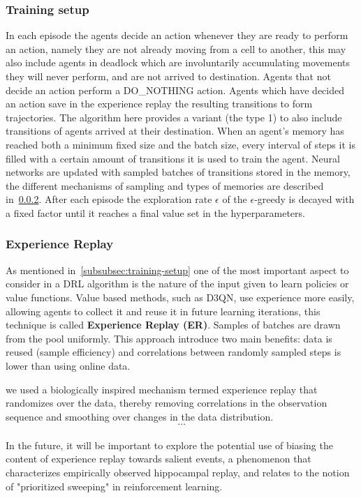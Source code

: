 \documentclass[11pt, a4paper, hidelinks]{report}
\begin{document}
\subsubsection{Training setup}\label{subsubsec:training-setup2}

In each episode the agents decide an action whenever they are ready to perform an action, namely they are not already moving from a cell to another, this may also include agents in deadlock which are involuntarily accumulating movements they will never perform, and are not arrived to destination.
Agents that not decide an action perform a DO\_NOTHING action.
Agents which have decided an action save in the experience replay the resulting transitions to form trajectories.
The algorithm here provides a variant (the type 1) to also include transitions of agents arrived at their destination.
When an agent's memory has reached both a minimum fixed size and the batch size, every interval of steps it is filled with a certain amount of transitions it is used to train the agent.
Neural networks are updated with sampled batches of transitions stored in the memory, the different mechanisms of sampling and types of memories are described in~\ref{subsubsec:experience-replay}.
After each episode the exploration rate $\epsilon$ of the $\epsilon$-greedy is decayed with a fixed factor until it reaches a final value set in the hyperparameters.

\subsubsection{Experience Replay}\label{subsubsec:experience-replay}

As mentioned in~\ref{subsubsec:training-setup} one of the most important aspect to consider in a DRL algorithm is the nature of the input given to learn policies or value functions.
Value based methods, such as D3QN, use experience more easily, allowing agents to collect it and reuse it in future learning iterations, this technique is called \textbf{Experience Replay (ER)}.
Samples of batches are drawn from the pool uniformly.
This approach introduce two main benefits: data is reused (sample efficiency) and correlations between randomly sampled steps is lower than using online data.

\begin{quoting}[font=itshape, begintext={"}, endtext={"\citep{human-level}}]
we used a biologically inspired mechanism termed experience replay that randomizes over the data, thereby removing correlations in the observation sequence and smoothing over changes in the data distribution.\\
\[\dots\]\\
In the future, it will be important to explore the potential use of biasing the content of experience replay towards salient events, a phenomenon that characterizes empirically observed hippocampal replay, and relates to the notion of "prioritized sweeping" in reinforcement learning.
\end{quoting}
\end{document}
